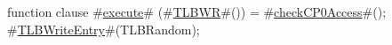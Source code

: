 function clause #\hyperref[zexecute]{execute}# (#\hyperref[zTLBWR]{TLBWR}#()) = {
  #\hyperref[zcheckCPzeroAccess]{checkCP0Access}#();
  #\hyperref[zTLBWriteEntry]{TLBWriteEntry}#(TLBRandom);
}
